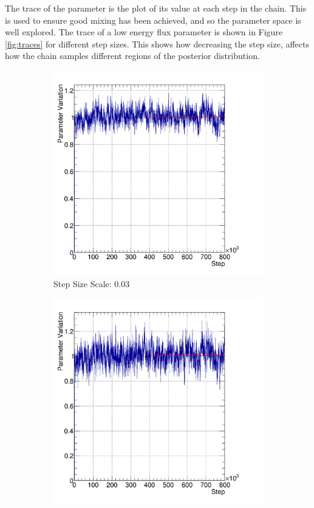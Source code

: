 The trace of the parameter is the plot of its value at each step in the chain. This is used to ensure good mixing has been achieved, and so the parameter space is well explored. The trace of a low energy flux parameter is shown in Figure \ref{fig:traces} for different step sizes. This shows how decreasing the step size, affects how the chain samples different regions of the posterior distribution.

\begin{figure}
\centering
\begin{subfigure}{.5\textwidth}
  \centering
  \includegraphics[width=0.73\linewidth]{figs/trace0}
  \caption{Step Size Scale: 0.03}
  \label{fig:trace0}
\end{subfigure}%
\begin{subfigure}{.5\textwidth}
  \centering
  \includegraphics[width=0.73\linewidth]{figs/trace1}

\end{subfigure}
\end{figure}
